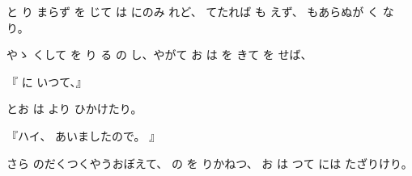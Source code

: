 と
り
まらず
を
じて
は
にのみ
れど、
てたれば
も
えず、
もあらぬが
く
なり。

やゝ
くして
を
り
る
の
し、やがて
お
は
を
きて
を
せば、

『
に
いつて、』

とお
は
より
ひかけたり。

『ハイ、
あいましたので。
』

さら
のだくつくやうおぼえて、
の
を
りかねつ、
お
は
つて
には
たざりけり。

